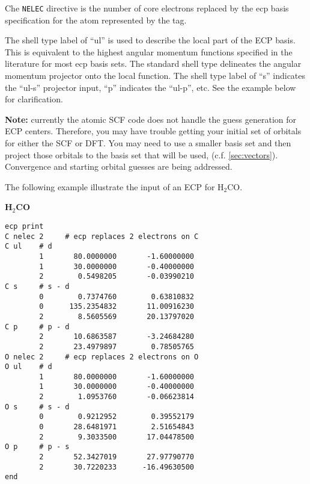 Che \verb+NELEC+ directive is the number of core electrons replaced by
the ecp basis specification for the atom represented by the tag.  

The shell type label of ``ul'' is used to describe the local part of
the ECP basis.  This is equivalent to the highest angular momentum
functions specified in the literature for most ecp basis sets.  The
standard shell type delineates the angular momentum projector onto the
local function.  The shell type label of ``s'' indicates the ``ul-s''
projector input, ``p'' indicates the ``ul-p'', etc.  See the example
below for clarification. 

{\bf Note:} currently the atomic SCF code does not handle the guess
generation for ECP centers.  Therefore, you may have trouble getting
your initial set of orbitals for either the SCF or DFT.  You may need
to use a smaller basis set and then project those orbitals to the
basis set that will be used, (c.f. \ref{sec:vectors}).  Convergence
and starting orbital guesses are being addressed.

The following example illustrate the input of an ECP for H$_2$CO.

\centerline{{\bf H$_2$CO }}

\begin{verbatim}
ecp print  
C nelec 2     # ecp replaces 2 electrons on C
C ul    # d
        1       80.0000000       -1.60000000
        1       30.0000000       -0.40000000
        2        0.5498205       -0.03990210
C s     # s - d 
        0        0.7374760        0.63810832
        0      135.2354832       11.00916230
        2        8.5605569       20.13797020
C p     # p - d
        2       10.6863587       -3.24684280
        2       23.4979897        0.78505765
O nelec 2     # ecp replaces 2 electrons on O
O ul    # d 
        1       80.0000000       -1.60000000
        1       30.0000000       -0.40000000
        2        1.0953760       -0.06623814
O s     # s - d
        0        0.9212952        0.39552179
        0       28.6481971        2.51654843
        2        9.3033500       17.04478500
O p     # p - s 
        2       52.3427019       27.97790770
        2       30.7220233      -16.49630500
end
\end{verbatim}

